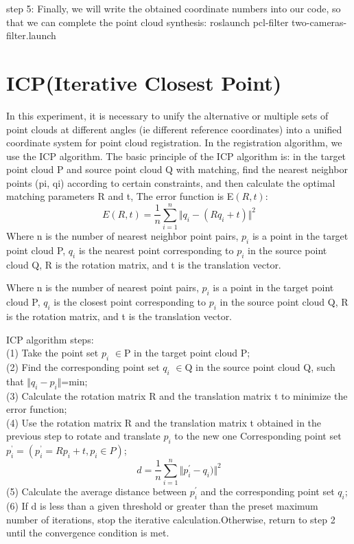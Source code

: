    
step 5:
Finally, we will write the obtained coordinate numbers into our code, so that we can complete the point cloud synthesis:
roslaunch pcl-filter two-cameras-filter.launch\\

\section{ICP(Iterative Closest Point)}
In this experiment, it is necessary to unify the alternative or multiple sets of point clouds at different angles (ie different reference coordinates) into a unified coordinate system for point cloud registration. In the registration algorithm, we use the ICP algorithm.
The basic principle of the ICP algorithm is: in the target point cloud P and source point cloud Q with matching, find the nearest neighbor points (pi, qi) according to certain constraints, and then calculate the optimal matching parameters R and t, The error function is E$\left(R,t\right)$:
$$E\left(R,t\right)=\frac 1n\sum_{i=1}^n \Vert q_i-(Rq_i+t)\Vert^2$$
Where n is the number of nearest neighbor point pairs, $p_i$ is a point in the target point cloud P, $q_i$ is the nearest point corresponding to $p_i$ in the source point cloud Q, R is the rotation matrix, and t is the translation vector.

Where n is the number of nearest point pairs, $p_i$ is a point in the target point cloud P, $q_i$ is the closest point corresponding to $p_i$ in the source point cloud Q, R is the rotation matrix, and t is the translation vector.

ICP algorithm steps:\\
(1) Take the point set $p_i$ $\in$P in the target point cloud P;\\
(2) Find the corresponding point set $q_i$ $\in$Q in the source point cloud Q, such that $\Vert q_i-p_i\Vert$=min;\\
(3) Calculate the rotation matrix R and the translation matrix t to minimize the error function;\\
(4) Use the rotation matrix R and the translation matrix t obtained in the previous step to rotate and translate $p_i$ to the new one Corresponding point set $p_{i}^{’}=(p_{i}^{’}=Rp_{i}+t,p_{i} \in P)$;\\$$d=\frac 1n\sum_{i=1}^n \Vert p_{i}^{'}-q_i)\Vert^2$$
(5) Calculate the average distance between $p_{i}^{'}$ and the corresponding point set $q_{i}$;\\
(6) If d is less than a given threshold or greater than the preset maximum number of iterations, stop the iterative calculation.Otherwise, return to step 2 until the convergence condition is met.\\

